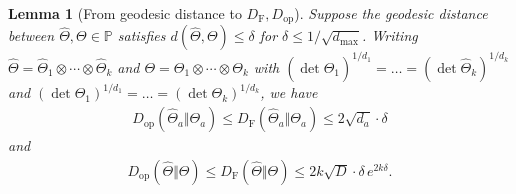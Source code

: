 \documentclass[aos]{imsart}
\newtheorem{lemma}[theorem]{Lemma}
\theoremstyle{definition}
\numberwithin{equation}{section}
\renewcommand{\P}{{\mathbb{P}}}
\newcommand{\htheta}{\widehat{\Theta}}
\newcommand{\ot}{\otimes}
\newcommand{\DF}{D_{\operatorname{F}}}
\newcommand{\Dop}{D_{\operatorname{op}}}
\def\dmax{d_{\max}}
\begin{document}
\begin{lemma}[From geodesic distance to $\DF, \Dop$] \label{cor:g-convex-components}
Suppose the geodesic distance between $\htheta, \Theta \in \P$ satisfies $d(\htheta, \Theta) \leq \delta$ for $\delta \leq 1/ \sqrt{\dmax}$.
Writing $\htheta = \htheta_1 \ot \cdots \ot \htheta_k$ and $\Theta = \Theta_1 \ot \cdots \ot \Theta_k$ with $(\det\htheta_1)^{1/d_1} = \ldots = (\det\htheta_k)^{1/d_k}$ and $(\det\Theta_1)^{1/d_1} = \ldots = (\det\Theta_k)^{1/d_k}$, we have
\begin{align*}
  \Dop(\htheta_a \Vert \Theta_a)
\leq \DF(\htheta_a \Vert \Theta_a)
\leq 2 \sqrt{d_a} \cdot \delta
\end{align*}
and
\begin{align*}
  \Dop(\htheta \Vert \Theta)
\leq \DF(\htheta \Vert \Theta)
\leq 2 k \sqrt{D} \cdot \delta \, e^{2k\delta}.
\end{align*}
\end{lemma}
\end{document}
